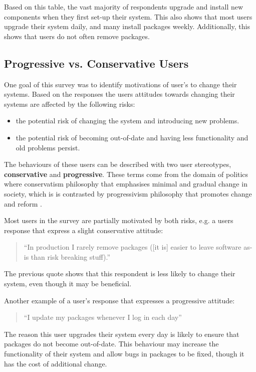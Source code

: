Based on this table, the vast majority of respondents upgrade and install new components when they first set-up their system.
This also shows that most users upgrade their system daily, and many install packages weekly.
Additionally, this shows that users do not often remove packages. 

\subsection{Progressive vs. Conservative Users}
One goal of this survey was to identify motivations of user's to change their systems.
Based on the responses the users attitudes towards changing their systems are affected by the following risks:
\begin{itemize}
  \item the potential risk of changing the system and introducing new problems.
  \item the potential risk of becoming out-of-date and having less functionality and old problems persist.
\end{itemize}
The behaviours of these users can be described with two user stereotypes, \textbf{conservative} and \textbf{progressive}.
These terms come from the domain of politics where conservatism philosophy that emphasises minimal and gradual change in society,
which is is contrasted by progressivism philosophy that promotes change and reform \citep{oed2010}.

Most users in the survey are partially motivated by both risks, e.g. a users response that express a slight conservative attitude:
\begin{quotation}
``In production I rarely remove packages ([it is] easier to leave software as-is than risk breaking stuff).''
\end{quotation}
The previous quote shows that this respondent is less likely to change their system, even though it may be beneficial. 

Another example of a user's response that expresses a progressive attitude:
\begin{quotation}
``I update my packages whenever I log in each day''
\end{quotation}
The reason this user upgrades their system every day is likely to ensure that packages do not become out-of-date.
This behaviour may increase the functionality of their system and allow bugs in packages to be fixed, though it has the cost of additional change.

